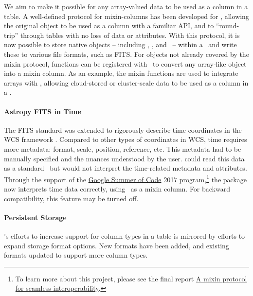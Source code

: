 \documentclass[modern]{aastex631}
\begin{document}
We aim to make it possible for any array-valued data to be used as a column in a
table. A well-defined protocol for mixin-columns has been developed for
\astropytable, allowing the original object to be used as a column with a
familiar API, and to ``round-trip'' through tables with no loss of data or
attributes. With this protocol, it is now possible to store \astropy native
objects -- including \astropyTime, \astropyQuantity, and \astropySkyCoord\ --
within a \astropyTable\ and write these to various file formats, such as FITS.
For objects not already covered by the mixin protocol, functions can be
registered with \astropyTable\ to convert any array-like object into a mixin
column. As an example, the mixin functions are used to integrate 
arrays with \astropyTable, allowing cloud-stored or cluster-scale data to be
used as a column in a \astropyTable.

\paragraph{Astropy FITS in Time}

The FITS standard was extended to rigorously describe time coordinates in the
WCS framework \citep{FITS-Time:2015}. Compared to
other types of coordinates in WCS, time requires more metadata: format, scale,
position, reference, etc. This metadata had to be manually specified and the
nuances understood by the user. \astropyfits could read this data as a standard
\astropyFitsColumn\, but would not interpret the time-related metadata and
attributes. Through the support of the
\href{https://summerofcode.withgoogle.com/archive/2017/projects/4778482366152704}{Google
Summer of Code} 2017 program,\footnote{ To learn more about this project, please
see the final report
\href{https://aaryapatil.wordpress.com/2017/08/28/a-mixin-protocol-for-seamless-interoperability/}{A
mixin protocol for seamless interoperability}.} the \astropyfits package now
interprets time data correctly, using \astropyTime\ as a mixin column. For
backward compatibility, this feature may be turned off.

\paragraph{Persistent Storage}

\astropy's efforts to increase support for column types in a table is mirrored
by efforts to expand storage format options. New formats have been added, and
existing formats updated to support more column types.
\end{document}
